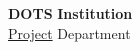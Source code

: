 \documentclass{article}
\begin{document}
\noindent
\large
\textbf{DOTS} \hfill \textbf{Institution} \\
\normalsize
\hyperlink{project_link}{Project} \hfill Department \\



\clearpage


\end{document}

